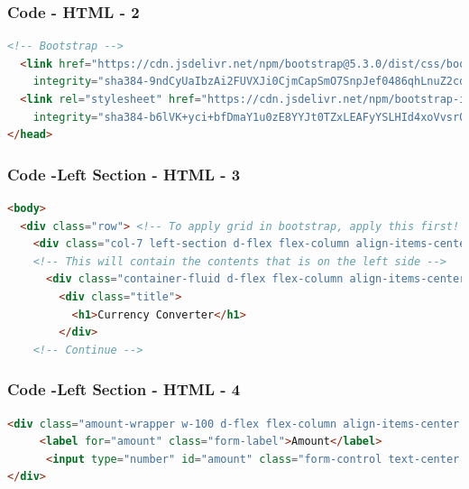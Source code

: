 \documentclass[aspectratio=169, table]{beamer}
\begin{document}
\begin{frame}[fragile]
    \frametitle{Code - HTML - 2}
    \vskip1cm
    \begin{lstlisting}[language=HTML]
  <!-- Bootstrap -->
  <link href="https://cdn.jsdelivr.net/npm/bootstrap@5.3.0/dist/css/bootstrap.min.css" rel="stylesheet"
    integrity="sha384-9ndCyUaIbzAi2FUVXJi0CjmCapSmO7SnpJef0486qhLnuZ2cdeRhO02iuK6FUUVM" crossorigin="anonymous" />
  <link rel="stylesheet" href="https://cdn.jsdelivr.net/npm/bootstrap-icons@1.10.2/font/bootstrap-icons.css"
    integrity="sha384-b6lVK+yci+bfDmaY1u0zE8YYJt0TZxLEAFyYSLHId4xoVvsrQu3INevFKo+Xir8e" crossorigin="anonymous" />
</head>
    \end{lstlisting}
\end{frame}

\begin{frame}[fragile]
    \frametitle{Code -Left Section - HTML - 3}
    \vskip1cm
    \begin{lstlisting}[language=HTML]
<body>
  <div class="row"> <!-- To apply grid in bootstrap, apply this first! -->
    <div class="col-7 left-section d-flex flex-column align-items-center justify-content-center">
	<!-- This will contain the contents that is on the left side -->
      <div class="container-fluid d-flex flex-column align-items-center justify-content-center gap-4">
        <div class="title">
          <h1>Currency Converter</h1>
        </div>
	<!-- Continue -->
    \end{lstlisting}
\end{frame}

\begin{frame}[fragile]
    \frametitle{Code -Left Section - HTML - 4}
    \vskip1cm
    \begin{lstlisting}[language=HTML]
<div class="amount-wrapper w-100 d-flex flex-column align-items-center justify-content-center">
     <label for="amount" class="form-label">Amount</label>
      <input type="number" id="amount" class="form-control text-center rounded-pill w-75" />
</div>
    \end{lstlisting}
\end{frame}
\end{document}

